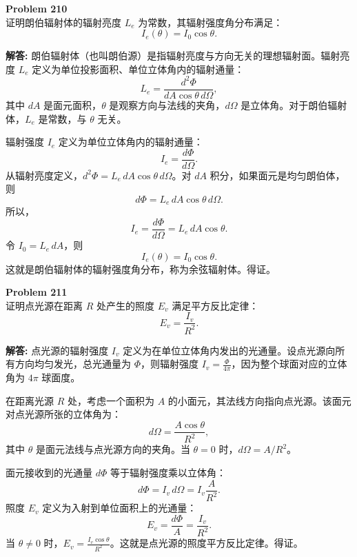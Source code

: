 \documentclass[12pt, a4paper, oneside]{ctexart}
\newenvironment{solution}{\par\noindent\textbf{解答:}\quad}{\par}
\begin{document}
\begin{mdframed}[backgroundcolor=gray!10, linewidth=0pt]
    \textbf{Problem 210} \\
    证明朗伯辐射体的辐射亮度 $L_e$ 为常数，其辐射强度角分布满足：
    \[
    I_e(\theta) = I_0 \cos\theta.
    \]
\end{mdframed}
\begin{solution}
    朗伯辐射体（也叫朗伯源）是指辐射亮度与方向无关的理想辐射面。辐射亮度 $L_e$ 定义为单位投影面积、单位立体角内的辐射通量：
    \[
    L_e = \frac{d^2 \Phi}{dA \cos\theta \, d\Omega},
    \]
    其中 $dA$ 是面元面积，$\theta$ 是观察方向与法线的夹角，$d\Omega$ 是立体角。对于朗伯辐射体，$L_e$ 是常数，与 $\theta$ 无关。

    辐射强度 $I_e$ 定义为单位立体角内的辐射通量：
    \[
    I_e = \frac{d\Phi}{d\Omega}.
    \]
    从辐射亮度定义，$d^2 \Phi = L_e \, dA \cos\theta \, d\Omega$。对 $dA$ 积分，如果面元是均匀朗伯体，则
    \[
    d\Phi = L_e \, dA \cos\theta \, d\Omega.
    \]
    所以，
    \[
    I_e = \frac{d\Phi}{d\Omega} = L_e \, dA \cos\theta.
    \]
    令 $I_0 = L_e \, dA$，则
    \[
    I_e(\theta) = I_0 \cos\theta.
    \]
    这就是朗伯辐射体的辐射强度角分布，称为余弦辐射体。得证。
\end{solution}
\begin{mdframed}[backgroundcolor=gray!10, linewidth=0pt]
    \textbf{Problem 211} \\
    证明点光源在距离 $R$ 处产生的照度 $E_v$ 满足平方反比定律：
    \[
    E_v = \frac{I_v}{R^2}.
    \]
\end{mdframed}
\begin{solution}
    点光源的辐射强度 $I_v$ 定义为在单位立体角内发出的光通量。设点光源向所有方向均匀发光，总光通量为 $\Phi$，则辐射强度 $I_v = \frac{\Phi}{4\pi}$，因为整个球面对应的立体角为 $4\pi$ 球面度。

    在距离光源 $R$ 处，考虑一个面积为 $A$ 的小面元，其法线方向指向点光源。该面元对点光源所张的立体角为：
    \[
    d\Omega = \frac{A \cos\theta}{R^2},
    \]
    其中 $\theta$ 是面元法线与点光源方向的夹角。当 $\theta = 0$ 时，$d\Omega = A/R^2$。

    面元接收到的光通量 $d\Phi$ 等于辐射强度乘以立体角：
    \[
    d\Phi = I_v \, d\Omega = I_v \frac{A}{R^2}.
    \]
    照度 $E_v$ 定义为入射到单位面积上的光通量：
    \[
    E_v = \frac{d\Phi}{A} = \frac{I_v}{R^2}.
    \]
    当 $\theta \neq 0$ 时，$E_v = \frac{I_v \cos\theta}{R^2}$。这就是点光源的照度平方反比定律。得证。
\end{solution}
\end{document}
